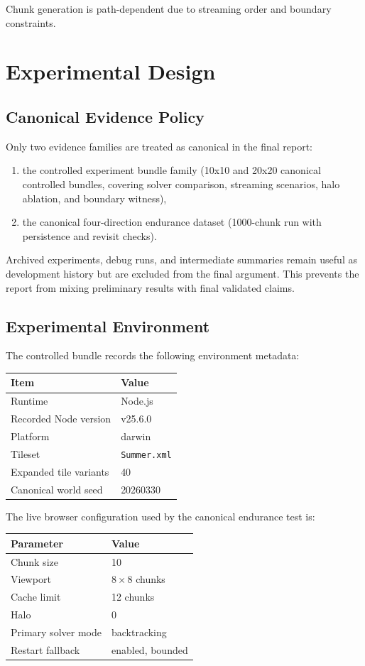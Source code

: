 \documentclass[12pt,a4paper]{report}
\begin{document}
Chunk generation is path-dependent due to streaming order and boundary constraints.

\chapter{Experimental Design}
\section{Canonical Evidence Policy}
Only two evidence families are treated as canonical in the final report:
\begin{enumerate}
\item the controlled experiment bundle family (10x10 and 20x20 canonical controlled bundles, covering solver comparison, streaming scenarios, halo ablation, and boundary witness),
\item the canonical four-direction endurance dataset (1000-chunk run with persistence and revisit checks).
\end{enumerate}
Archived experiments, debug runs, and intermediate summaries remain useful as development history but are excluded from the final argument. This prevents the report from mixing preliminary results with final validated claims.

\section{Experimental Environment}
The controlled bundle records the following environment metadata:
\begin{center}
\begin{tabular}{ll}
\toprule
Item & Value \\
\midrule
Runtime & Node.js \\
Recorded Node version & v25.6.0 \\
Platform & darwin \\
Tileset & \texttt{Summer.xml} \\
Expanded tile variants & 40 \\
Canonical world seed & 20260330 \\
\bottomrule
\end{tabular}
\end{center}

The live browser configuration used by the canonical endurance test is:
\begin{center}
\begin{tabular}{ll}
\toprule
Parameter & Value \\
\midrule
Chunk size & 10 \\
Viewport & $8 \times 8$ chunks \\
Cache limit & 12 chunks \\
Halo & 0 \\
Primary solver mode & backtracking \\
Restart fallback & enabled, bounded \\
\bottomrule
\end{tabular}
\end{center}
\end{document}
